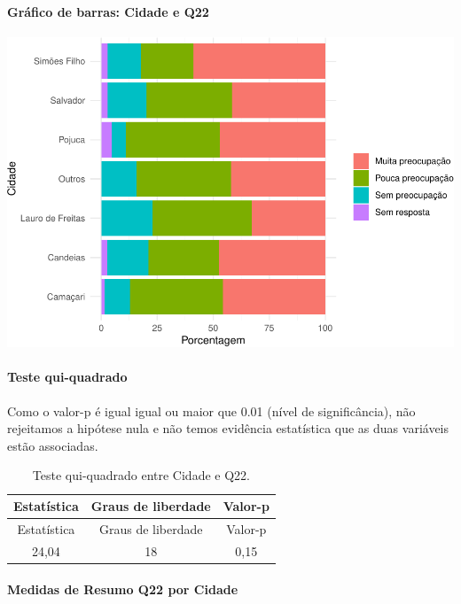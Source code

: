 \documentclass[]{article}
\let\oldparagraph\paragraph
\renewcommand{\paragraph}[1]{\oldparagraph{#1}\mbox{}}
\begin{document}
\hypertarget{gruxe1fico-de-barras-cidade-e-q22}{%
\paragraph{Gráfico de barras: Cidade e Q22}\label{gruxe1fico-de-barras-cidade-e-q22}}

\begin{center}\includegraphics[width=0.75\linewidth]{relatorio_covid19_files/figure-latex/unnamed-chunk-486-1} \end{center}

\hypertarget{teste-qui-quadrado-42}{%
\paragraph{Teste qui-quadrado}\label{teste-qui-quadrado-42}}

Como o valor-p é igual igual ou maior que 0.01 (nível de significância), não rejeitamos a hipótese nula e não temos evidência estatística que as duas variáveis estão associadas.

\begin{longtable}[]{@{}ccc@{}}
\caption{\label{tab:unnamed-chunk-488}Teste qui-quadrado entre Cidade e Q22.}\tabularnewline
\toprule
Estatística & Graus de liberdade & Valor-p\tabularnewline
\midrule
\endfirsthead
\toprule
Estatística & Graus de liberdade & Valor-p\tabularnewline
\midrule
\endhead
24,04 & 18 & 0,15\tabularnewline
\bottomrule
\end{longtable}

\cleardoublepage

\hypertarget{medidas-de-resumo-q22-por-cidade}{%
\paragraph{Medidas de Resumo Q22 por Cidade}\label{medidas-de-resumo-q22-por-cidade}}
\end{document}
